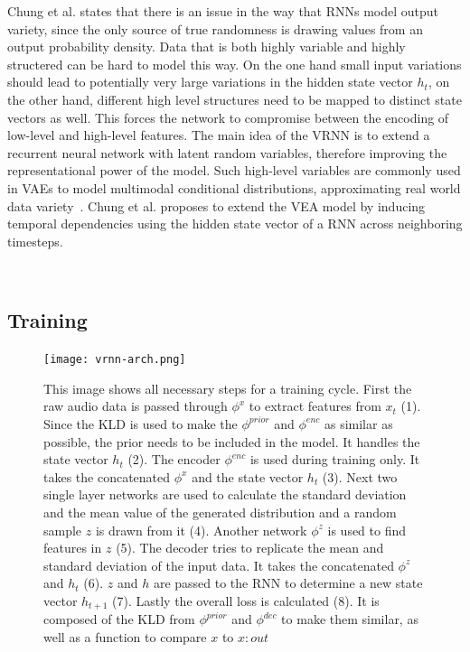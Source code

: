 \documentclass[12pt]{article}
\begin{document}
Chung et al. states that there is an issue in the way that RNNs model output variety, since the only source of true randomness is drawing values from an output probability density.
Data that is both highly variable and highly structered can be hard to model this way.
On the one hand small input variations should lead to potentially very large variations in the hidden state vector $h_t$, on the other hand, different high level structures need to be mapped to distinct state vectors as well.
This forces the network to compromise between the encoding of low-level and high-level features.
The main idea of the VRNN is to extend a recurrent neural network with latent random variables, therefore improving the representational power of the model.
Such high-level variables are commonly used in VAEs to model multimodal conditional distributions, approximating real world data variety~\cite{kingma2013auto}.
Chung et al. proposes to extend the VEA model by inducing temporal dependencies using the hidden state vector of a RNN across neighboring timesteps.



 



\subsection{Training}

\begin{figure}
\texttt{[image: vrnn-arch.png]}
\label{fig:vrnn-arch}
\caption{
This image shows all necessary steps for a training cycle.
First the raw audio data is passed through $\phi^x$ to extract features from $x_t$ (1).
Since the KLD is used to make the $\phi^{prior}$ and $\phi^{enc}$ as similar as possible, the prior needs to be included in the model.
It handles the state vector $h_t$ (2).
The encoder $\phi^{enc}$ is used during training only.
It takes the concatenated $\phi^x$ and the state vector $h_t$ (3).
Next two single layer networks are used to calculate the standard deviation and the mean value of the generated distribution and a random sample $z$ is drawn from it (4).
Another network $\phi^z$ is used to find features in $z$ (5).
The decoder tries to replicate the mean and standard deviation of the input data. %
It takes the concatenated $\phi^z$ and $h_t$ (6).
$z$ and $h$ are passed to the RNN to determine a new state vector $h_{t+1}$ (7).
Lastly the overall loss is calculated (8).
It is composed of the KLD from $\phi^{prior}$ and $\phi^{dec}$ to make them similar, as well as a function to compare $x$ to $x:out$ %
}
\end{figure}
\end{document}

